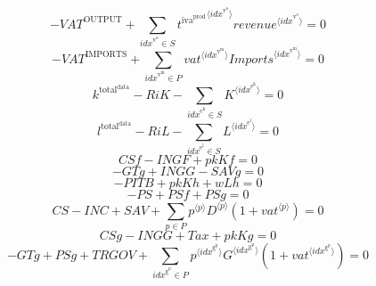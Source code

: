 \begin{equation}
-{V\!A\!T}^{\mathrm{OUTPUT}} + \sum_{{i\!d\!x}^{\mathrm{v}^{\mathrm{o}}}\in S} {{t^{\mathrm{iva}^{\mathrm{prod}}}}^{\langle {i\!d\!x}^{\mathrm{v}^{\mathrm{o}}}\rangle}} {{{r\!e\!v\!e\!n\!u\!e}}^{\langle {i\!d\!x}^{\mathrm{v}^{\mathrm{o}}}\rangle}} = 0
\end{equation}
\begin{equation}
-{V\!A\!T}^{\mathrm{IMPORTS}} + \sum_{{i\!d\!x}^{\mathrm{v}^{\mathrm{m}}}\in P} {{{v\!a\!t}}^{\langle {i\!d\!x}^{\mathrm{v}^{\mathrm{m}}}\rangle}} {{{I\!m\!p\!o\!r\!t\!s}}^{\langle {i\!d\!x}^{\mathrm{v}^{\mathrm{m}}}\rangle}} = 0
\end{equation}
\begin{equation}
k^{\mathrm{total}^{\mathrm{data}}} - {R\!i\!K} - \sum_{{i\!d\!x}^{\mathrm{e}^{\mathrm{k}}}\in S} {K}^{\langle {i\!d\!x}^{\mathrm{e}^{\mathrm{k}}}\rangle} = 0
\end{equation}
\begin{equation}
l^{\mathrm{total}^{\mathrm{data}}} - {R\!i\!L} - \sum_{{i\!d\!x}^{\mathrm{e}^{\mathrm{l}}}\in S} {L}^{\langle {i\!d\!x}^{\mathrm{e}^{\mathrm{l}}}\rangle} = 0
\end{equation}
\begin{equation}
{C\!S\!f} - {I\!N\!G\!F} + {{p\!k}} {{K\!f}} = 0
\end{equation}
\begin{equation}
-{G\!T\!g} + {I\!N\!G\!G} - {S\!A\!V\!g} = 0
\end{equation}
\begin{equation}
-{P\!I\!T\!B} + {{p\!k}} {{K\!h}} + {w} {{L\!h}} = 0
\end{equation}
\begin{equation}
-{P\!S} + {P\!S\!f} + {P\!S\!g} = 0
\end{equation}
\begin{equation}
{C\!S} - {I\!N\!C} + {S\!A\!V} + \sum_{p\in P} {{p}^{\langle p\rangle}} {{D}^{\langle p\rangle}} \left(1 + {{v\!a\!t}}^{\langle p\rangle}\right) = 0
\end{equation}
\begin{equation}
{C\!S\!g} - {I\!N\!G\!G} + {T\!a\!x} + {{p\!k}} {{K\!g}} = 0
\end{equation}
\begin{equation}
-{G\!T\!g} + {P\!S\!g} + {T\!R\!G\!O\!V} + \sum_{{i\!d\!x}^{\mathrm{g}^{\mathrm{p}}}\in P} {{p}^{\langle {i\!d\!x}^{\mathrm{g}^{\mathrm{p}}}\rangle}} {{G}^{\langle {i\!d\!x}^{\mathrm{g}^{\mathrm{p}}}\rangle}} \left(1 + {{v\!a\!t}}^{\langle {i\!d\!x}^{\mathrm{g}^{\mathrm{p}}}\rangle}\right) = 0
\end{equation}
